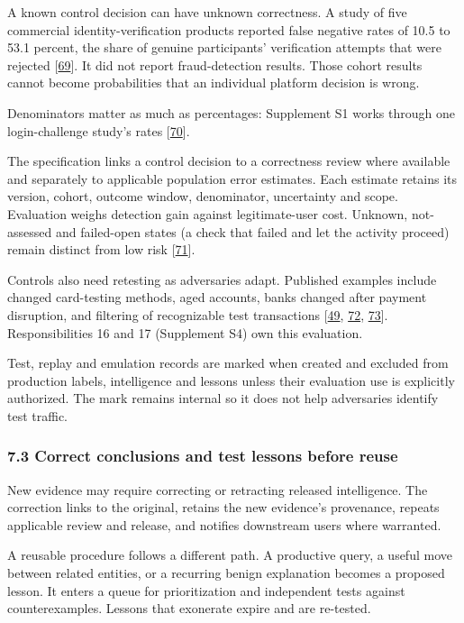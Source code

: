 \documentclass[
  11pt,
]{article}
\begin{document}
A known control decision can have unknown correctness. A study of five
commercial identity-verification products reported false negative rates
of 10.5 to 53.1 percent, the share of genuine participants' verification
attempts that were rejected
{[}\protect\hyperlink{ref-Fatima2024}{69}{]}. It did not report
fraud-detection results. Those cohort results cannot become
probabilities that an individual platform decision is wrong.

Denominators matter as much as percentages: Supplement S1 works through
one login-challenge study's rates
{[}\protect\hyperlink{ref-Doerfler2019}{70}{]}.

The specification links a control decision to a correctness review where
available and separately to applicable population error estimates. Each
estimate retains its version, cohort, outcome window, denominator,
uncertainty and scope. Evaluation weighs detection gain against
legitimate-user cost. Unknown, not-assessed and failed-open states (a
check that failed and let the activity proceed) remain distinct from low
risk {[}\protect\hyperlink{ref-Stripe2026PAYG}{71}{]}.

Controls also need retesting as adversaries adapt. Published examples
include changed card-testing methods, aged accounts, banks changed after
payment disruption, and filtering of recognizable test transactions
{[}\protect\hyperlink{ref-Thomas2013}{49},
\protect\hyperlink{ref-Meltzer2025}{72},
\protect\hyperlink{ref-Tian2018}{73}{]}. Responsibilities 16 and 17
(Supplement S4) own this evaluation.

Test, replay and emulation records are marked when created and excluded
from production labels, intelligence and lessons unless their evaluation
use is explicitly authorized. The mark remains internal so it does not
help adversaries identify test traffic.

\hypertarget{correct-conclusions-and-test-lessons-before-reuse}{%
\subsubsection{7.3 Correct conclusions and test lessons before
reuse}\label{correct-conclusions-and-test-lessons-before-reuse}}

New evidence may require correcting or retracting released intelligence.
The correction links to the original, retains the new evidence's
provenance, repeats applicable review and release, and notifies
downstream users where warranted.

A reusable procedure follows a different path. A productive query, a
useful move between related entities, or a recurring benign explanation
becomes a proposed lesson. It enters a queue for prioritization and
independent tests against counterexamples. Lessons that exonerate expire
and are re-tested.
\end{document}
